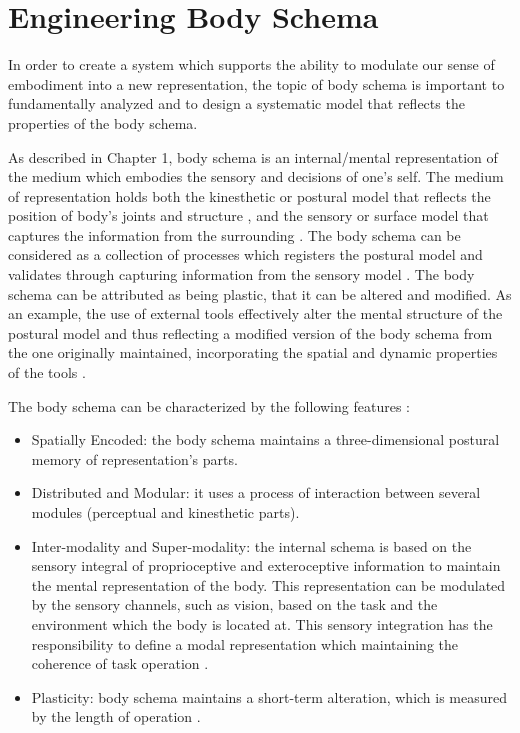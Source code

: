 \newpage
\section{Engineering Body Schema}
\label{sec:concept-engineering}

In order to create a system which supports the ability to modulate our sense of embodiment into a new representation, the topic of body schema is important to fundamentally analyzed and to design a systematic model that reflects the properties of the body schema. 

As described in Chapter 1, body schema is an internal/mental representation of the medium which embodies the sensory and decisions of one's self. The medium of representation holds both the kinesthetic or postural model that reflects the position of body's joints and structure \cite{holmes2004body}, and the sensory or surface model that captures the information from the surrounding \cite{macaluso2010representation}. The body schema can be considered as a collection of processes which registers the postural model and validates through capturing information from the sensory model \cite{maravita2003multisensory,haggard2005disorders}. The body schema can be attributed as being plastic, that it can be altered and modified. As an example, the use of external tools effectively alter the mental structure of the postural model and thus reflecting a modified version of the body schema from the one originally maintained, incorporating the spatial and dynamic properties of the tools \cite{berti2000far,maravita2004tools,carlson2010rapid}. 

The body schema can be characterized by the following features \cite{morasso2015revisiting}:
\begin{itemize}
\item Spatially Encoded: the body schema maintains a three-dimensional postural memory of representation's parts.

\item Distributed and Modular: it uses a process of interaction between several modules (perceptual and kinesthetic parts).

\item Inter-modality and Super-modality: the internal schema is based on the sensory integral of proprioceptive and exteroceptive information to maintain the mental representation of the body. This representation can be modulated by the sensory channels, such as vision, based on the task and the environment which the body is located at. This sensory integration has the responsibility to define a modal representation which maintaining the coherence of task operation \cite{haggard2005disorders}.

\item Plasticity: body schema maintains a short-term alteration, which is measured by the length of operation \cite{maravita2004tools}. 

\end{itemize}

